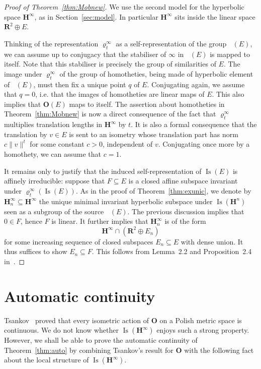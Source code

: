 \documentclass[11pt]{article}
\theoremstyle{definition}
\numberwithin{equation}{section}
\numberwithin{figure}{section}
\numberwithin{table}{section}
\newcommand{\RR}{\mathbf{R}}
\newcommand{\HH}{\mathbf{H}}
\newcommand{\HHI}{\mathbf{H}^{\infty}}
\newcommand{\OO}{{\mathbf O}}
\newcommand{\Isomi}{{\Isom}(\HHI)}
\DeclareMathOperator{\Isom}{Is}
\DeclareMathOperator{\Mob}{M\ddot{o}b}
\newcommand{\se}{\subseteq}
\newcommand{\ro}{\varrho}
\begin{document}
\begin{proof}[Proof of Theorem~\ref{thm:Mobnew}]
We use the second model for the hyperbolic space $\HHI$, as in Section~\ref{sec:model}. In particular $\HHI$ sits inside the linear space $\RR^2\oplus E$.

Thinking of the representation $\ro^\infty_t$ as a self-representation of the group $\Mob(E)$, we can assume up to conjugacy that the stabiliser of $\infty$ in $\Mob(E)$ is mapped to itself. Note that this stabiliser is precisely the group of similarities of $E$. The image under $\ro^\infty_t$ of the group of homotheties, being made of hyperbolic element of $\Mob(E)$, must then fix a unique point $q$ of $E$. Conjugating again, we assume that $q=0$, i.e. that the images of homotheties are linear maps of $E$. This also implies that $\OO(E)$ maps to itself. The assertion about homotheties in Theorem~\ref{thm:Mobnew} is now a direct consequence of the fact that $\ro^\infty_t$ multiplies translation lengths in $\HHI$ by $t$. It is also a formal consequence that the translation by $v\in E$ is sent to an isometry whose translation part has norm $c\| v\|^t$ for some constant $c>0$, independent of $v$. Conjugating once more by a homothety, we can assume that $c=1$.

It remains only to justify that the induced self-representation of $\Isom(E)$ is affinely irreducible: suppose that $F\se E$ is a closed affine subspace invariant under $\ro^\infty_t(\Isom(E))$. As in the proof of Theorem~\ref{thm:exunic}, we denote by $\HHI_n\se \HHI$ the unique minimal invariant hyperbolic subspace under $\Isom(\HH^n)$ seen as a subgroup of the source $\Mob(E)$. The previous discussion implies that $0\in F$, hence $F$ is linear. It further implies that $\HHI_n$ is of the form
\[
\HHI\cap \left(\RR^2\oplus E_n\right)
\]
for some increasing sequence of closed subspaces $E_n \se E$ with dense union. It thus suffices to show $E_n\se F$. This follows from Lemma~2.2 and Proposition~2.4 in~\cite{Monod-Py}.
\end{proof}


\section{Automatic continuity}\label{sec:auto}

Tsankov~\cite{Tsankov13} proved that every isometric action of $\OO$ on a Polish metric space is continuous. We do not know whether $\Isomi$ enjoys such a strong property. However, we shall be able to prove the automatic continuity of Theorem~\ref{thm:auto} by combining Tsankov's result for $\OO$ with the following fact about the local structure of $\Isomi$.
\end{document}
